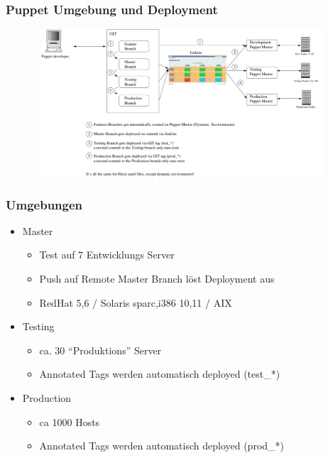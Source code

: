 \documentclass{beamer}
\begin{document}

\begin{frame}
\end{frame}

\begin{frame}
  \frametitle{Puppet Umgebung und Deployment}
  \begin{figure}[ht]
    \centering
      \includegraphics[height=5.5cm,width=11cm]{../pics/puppet_deployment2}
  \end{figure}
\end{frame}

\begin{frame}
  \frametitle{Umgebungen}

    \begin{itemize}
    \item Master
      \begin{itemize}
      \item Test auf 7 Entwicklungs Server
      \item Push auf Remote Master Branch löst Deployment aus
      \item RedHat 5,6 / Solaris {sparc,i386} {10,11} / AIX
      \end{itemize}
    \item Testing
      \begin{itemize}
      \item ca. 30 ``Produktions'' Server
      \item Annotated Tags werden automatisch deployed (test\_*)
      \end{itemize}
    \item Production
      \begin{itemize}
      \item ca 1000 Hosts
      \item Annotated Tags werden automatisch deployed (prod\_*)
      \end{itemize}
    \end{itemize}
\end{frame}
\end{document}
